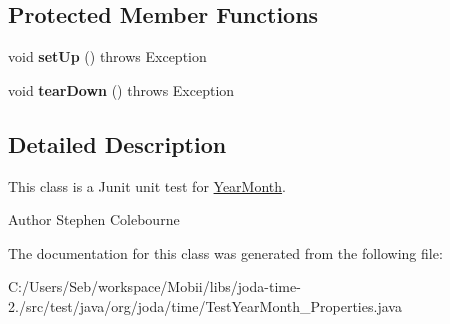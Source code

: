 \subsection*{Protected Member Functions}
\begin{DoxyCompactItemize}
\item 
\hypertarget{classorg_1_1joda_1_1time_1_1_test_year_month___properties_a2955d3a2399a04803e17b873b989e3c6}{void {\bfseries set\-Up} ()  throws Exception }\label{classorg_1_1joda_1_1time_1_1_test_year_month___properties_a2955d3a2399a04803e17b873b989e3c6}

\item 
\hypertarget{classorg_1_1joda_1_1time_1_1_test_year_month___properties_ab72737ecf25b556d48ce1887d03adc29}{void {\bfseries tear\-Down} ()  throws Exception }\label{classorg_1_1joda_1_1time_1_1_test_year_month___properties_ab72737ecf25b556d48ce1887d03adc29}

\end{DoxyCompactItemize}


\subsection{Detailed Description}
This class is a Junit unit test for \hyperlink{classorg_1_1joda_1_1time_1_1_year_month}{Year\-Month}.

\begin{DoxyAuthor}{Author}
Stephen Colebourne 
\end{DoxyAuthor}


The documentation for this class was generated from the following file\-:\begin{DoxyCompactItemize}
\item 
C\-:/\-Users/\-Seb/workspace/\-Mobii/libs/joda-\/time-\/2./src/test/java/org/joda/time/Test\-Year\-Month\-\_\-\-Properties.\-java\end{DoxyCompactItemize}

